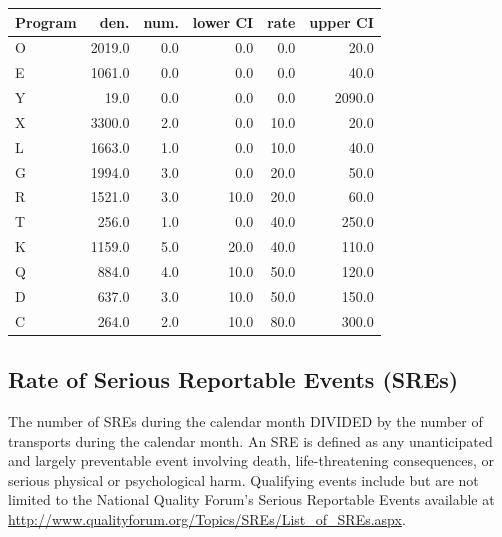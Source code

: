 \documentclass[twoside]{article}\usepackage[]{graphicx}\usepackage[]{color}
\begin{document}
\begin{table}[ht]
\centering
\begin{tabular}{lrrrrr}
  \hline
Program & den. & num. & lower CI & rate & upper CI \\ 
  \hline
O & 2019.0 & 0.0 & 0.0 & 0.0 & 20.0 \\ 
  E & 1061.0 & 0.0 & 0.0 & 0.0 & 40.0 \\ 
  Y & 19.0 & 0.0 & 0.0 & 0.0 & 2090.0 \\ 
  X & 3300.0 & 2.0 & 0.0 & 10.0 & 20.0 \\ 
  L & 1663.0 & 1.0 & 0.0 & 10.0 & 40.0 \\ 
  G & 1994.0 & 3.0 & 0.0 & 20.0 & 50.0 \\ 
  R & 1521.0 & 3.0 & 10.0 & 20.0 & 60.0 \\ 
  T & 256.0 & 1.0 & 0.0 & 40.0 & 250.0 \\ 
  K & 1159.0 & 5.0 & 20.0 & 40.0 & 110.0 \\ 
  Q & 884.0 & 4.0 & 10.0 & 50.0 & 120.0 \\ 
  D & 637.0 & 3.0 & 10.0 & 50.0 & 150.0 \\ 
  C & 264.0 & 2.0 & 10.0 & 80.0 & 300.0 \\ 
   \hline
\end{tabular}
\end{table}




\newpage
\subsection{Rate of Serious Reportable Events (SREs)}
The number of SREs during the calendar month DIVIDED by the number of transports during the calendar month. An SRE is defined as any unanticipated and largely preventable event involving death, life-threatening consequences, or serious physical or psychological harm. Qualifying events include but are not limited to the National Quality Forum's Serious Reportable Events available at \url{http://www.qualityforum.org/Topics/SREs/List_of_SREs.aspx}.
\end{document}
